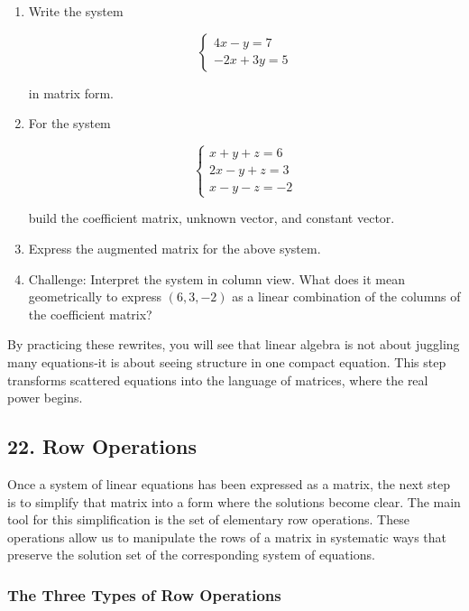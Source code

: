 \documentclass[
  letterpaper,
  DIV=11,
  numbers=noendperiod]{scrreprt}
\begin{document}
\begin{enumerate}
\def\labelenumi{\arabic{enumi}.}
\item
  Write the system

  \[
  \begin{cases}  
  4x - y = 7 \\  
  -2x + 3y = 5  
  \end{cases}
  \]

  in matrix form.
\item
  For the system

  \[
  \begin{cases}  
  x + y + z = 6 \\  
  2x - y + z = 3 \\  
  x - y - z = -2  
  \end{cases}
  \]

  build the coefficient matrix, unknown vector, and constant vector.
\item
  Express the augmented matrix for the above system.
\item
  Challenge: Interpret the system in column view. What does it mean
  geometrically to express \((6, 3, -2)\) as a linear combination of the
  columns of the coefficient matrix?
\end{enumerate}

By practicing these rewrites, you will see that linear algebra is not
about juggling many equations-it is about seeing structure in one
compact equation. This step transforms scattered equations into the
language of matrices, where the real power begins.

\subsection{22. Row Operations}\label{row-operations}

Once a system of linear equations has been expressed as a matrix, the
next step is to simplify that matrix into a form where the solutions
become clear. The main tool for this simplification is the set of
elementary row operations. These operations allow us to manipulate the
rows of a matrix in systematic ways that preserve the solution set of
the corresponding system of equations.

\subsubsection{The Three Types of Row
Operations}\label{the-three-types-of-row-operations}
\end{document}
